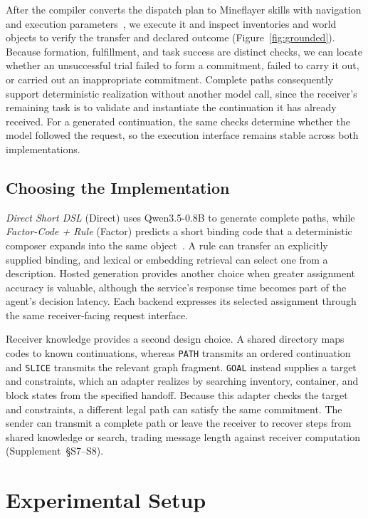 \documentclass[sigconf,nonacm,balance=false]{aamas}
\begin{document}
After the compiler converts the dispatch plan to Mineflayer skills with navigation and execution parameters~\cite{prismarinejs2026mineflayer}, we execute it and inspect inventories and world objects to verify the transfer and declared outcome (Figure~\ref{fig:grounded}). Because formation, fulfillment, and task success are distinct checks, we can locate whether an unsuccessful trial failed to form a commitment, failed to carry it out, or carried out an inappropriate commitment. Complete paths consequently support deterministic realization without another model call, since the receiver's remaining task is to validate and instantiate the continuation it has already received. For a generated continuation, the same checks determine whether the model followed the request, so the execution interface remains stable across both implementations.

\subsection{Choosing the Implementation}
\emph{Direct Short DSL} (Direct) uses Qwen3.5-0.8B to generate complete paths, while \emph{Factor-Code + Rule} (Factor) predicts a short binding code that a deterministic composer expands into the same object~\cite{qwenteam2026qwen35}. A rule can transfer an explicitly supplied binding, and lexical or embedding retrieval can select one from a description. Hosted generation provides another choice when greater assignment accuracy is valuable, although the service's response time becomes part of the agent's decision latency. Each backend expresses its selected assignment through the same receiver-facing request interface.

Receiver knowledge provides a second design choice. A shared directory maps codes to known continuations, whereas \texttt{PATH} transmits an ordered continuation and \texttt{SLICE} transmits the relevant graph fragment. \texttt{GOAL} instead supplies a target and constraints, which an adapter realizes by searching inventory, container, and block states from the specified handoff. Because this adapter checks the target and constraints, a different legal path can satisfy the same commitment. The sender can transmit a complete path or leave the receiver to recover steps from shared knowledge or search, trading message length against receiver computation (Supplement~\mbox{\S S7--S8}).

\section{Experimental Setup}
\label{sec:setup}
\end{document}
